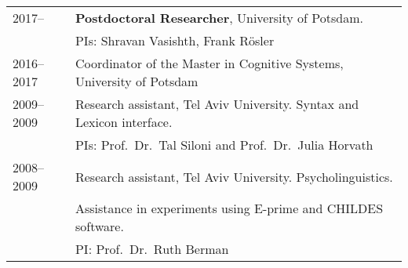 \documentclass[]{article}
\begin{document}
\begin{longtable}[]{@{}ll@{}}
\toprule
\endhead
\begin{minipage}[t]{0.25\columnwidth}\raggedright
2017--\strut
\end{minipage} & \begin{minipage}[t]{0.69\columnwidth}\raggedright
\textbf{Postdoctoral Researcher}, University of Potsdam.\strut
\end{minipage}\tabularnewline
\begin{minipage}[t]{0.25\columnwidth}\raggedright
\strut
\end{minipage} & \begin{minipage}[t]{0.69\columnwidth}\raggedright
PIs: Shravan Vasishth, Frank Rösler \strut
\end{minipage}\tabularnewline
\begin{minipage}[t]{0.25\columnwidth}\raggedright
2016--2017\strut
\end{minipage} & \begin{minipage}[t]{0.69\columnwidth}\raggedright
Coordinator of the Master in Cognitive Systems, University of Potsdam
\strut
\end{minipage}\tabularnewline
\begin{minipage}[t]{0.25\columnwidth}\raggedright
2009--2009\strut
\end{minipage} & \begin{minipage}[t]{0.69\columnwidth}\raggedright
Research assistant, Tel Aviv University. Syntax and Lexicon
interface.\strut
\end{minipage}\tabularnewline
\begin{minipage}[t]{0.25\columnwidth}\raggedright
\strut
\end{minipage} & \begin{minipage}[t]{0.69\columnwidth}\raggedright
PIs: Prof.~Dr.~Tal Siloni and Prof.~Dr.~Julia Horvath \strut
\end{minipage}\tabularnewline
\begin{minipage}[t]{0.25\columnwidth}\raggedright
2008--2009\strut
\end{minipage} & \begin{minipage}[t]{0.69\columnwidth}\raggedright
Research assistant, Tel Aviv University. Psycholinguistics.\strut
\end{minipage}\tabularnewline
\begin{minipage}[t]{0.25\columnwidth}\raggedright
\strut
\end{minipage} & \begin{minipage}[t]{0.69\columnwidth}\raggedright
Assistance in experiments using E-prime and CHILDES software.\strut
\end{minipage}\tabularnewline
\begin{minipage}[t]{0.25\columnwidth}\raggedright
\strut
\end{minipage} & \begin{minipage}[t]{0.69\columnwidth}\raggedright
PI: Prof.~Dr.~Ruth Berman\strut
\end{minipage}\tabularnewline
\bottomrule
\end{longtable}
\end{document}
